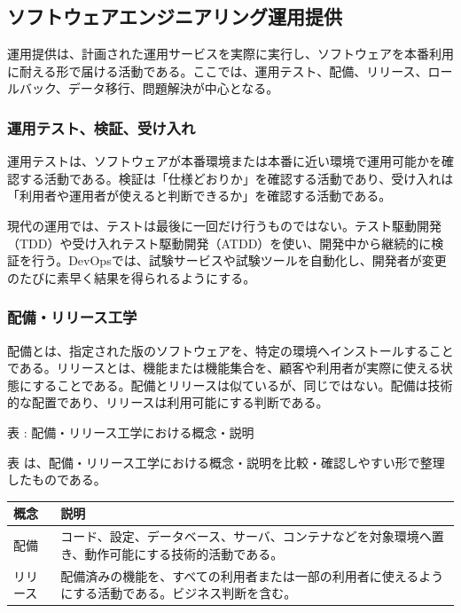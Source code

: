 \subsection{ソフトウェアエンジニアリング運用提供}

運用提供は、計画された運用サービスを実際に実行し、ソフトウェアを本番利用に耐える形で届ける活動である。ここでは、運用テスト、配備、リリース、ロールバック、データ移行、問題解決が中心となる。

\subsubsection{運用テスト、検証、受け入れ}

運用テストは、ソフトウェアが本番環境または本番に近い環境で運用可能かを確認する活動である。検証は「仕様どおりか」を確認する活動であり、受け入れは「利用者や運用者が使えると判断できるか」を確認する活動である。

現代の運用では、テストは最後に一回だけ行うものではない。テスト駆動開発（TDD）や受け入れテスト駆動開発（ATDD）を使い、開発中から継続的に検証を行う。DevOpsでは、試験サービスや試験ツールを自動化し、開発者が変更のたびに素早く結果を得られるようにする。

\subsubsection{配備・リリース工学}

配備とは、指定された版のソフトウェアを、特定の環境へインストールすることである。リリースとは、機能または機能集合を、顧客や利用者が実際に使える状態にすることである。配備とリリースは似ているが、同じではない。配備は技術的な配置であり、リリースは利用可能にする判断である。

\par\smallskip\noindent{}\label{tab:ch06-06}表 \thetable: 配備・リリース工学における概念・説明\par\smallskip
表 \thetable は、配備・リリース工学における概念・説明を比較・確認しやすい形で整理したものである。\par\smallskip
\begin{longtable}{L{35mm}L{115mm}}
\toprule
概念 & 説明 \\
\midrule
配備 & コード、設定、データベース、サーバ、コンテナなどを対象環境へ置き、動作可能にする技術的活動である。 \\
リリース & 配備済みの機能を、すべての利用者または一部の利用者に使えるようにする活動である。ビジネス判断を含む。 \\
\bottomrule
\end{longtable}

